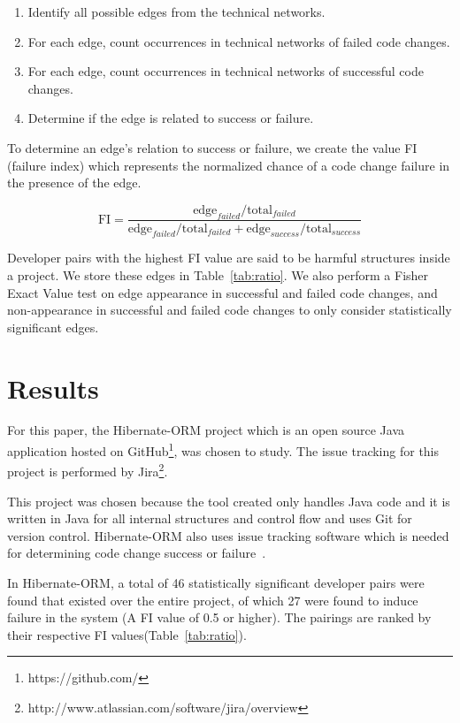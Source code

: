 \documentclass[conference]{IEEEtran}
\begin{document}
\begin{enumerate}
\item Identify all possible edges from the technical networks.
\item For each edge, count occurrences in technical networks of failed code changes.
\item For each edge, count occurrences in technical networks of successful code changes.
\item Determine if the edge is related to success or failure.
\end{enumerate}

To determine an edge's relation to success or failure, we create the value FI (failure
index) which represents the normalized chance of a code change failure in the presence
of the edge. 

\begin{equation}
\text{FI} = \frac{ \text{edge}_{failed} / \text{total}_{failed}}{\text{edge}_{failed} / \text{total}_{failed} + \text{edge}_{success} / \text{total}_{success}}
\end{equation}

Developer pairs with the highest FI value are said to be harmful structures
inside a project. We store these edges in Table~\ref{tab:ratio}. We also perform
a Fisher Exact Value test on edge appearance in successful and failed
code changes, and non-appearance in successful and failed code changes to only
consider statistically significant edges. 


\section{Results}
For this paper, the Hibernate-ORM project which is an open source Java 
application hosted on GitHub\footnote{https://github.com/}, was chosen to study. The issue tracking for this 
project is performed by Jira\footnote{http://www.atlassian.com/software/jira/overview}.

This project was chosen because the tool created only handles Java code and it is written in Java 
for all internal structures and control flow
and uses Git for version control. Hibernate-ORM also uses issue tracking software which 
is needed for determining code change success or failure~\cite{Sliwerski:2005:CIF}.

In Hibernate-ORM, a total of 46 statistically significant developer pairs were found that existed over the entire project, 
of which 27 were found to induce failure in the system (A FI value of 0.5 or higher). 
The pairings are ranked by their respective FI values(Table~\ref{tab:ratio}).
\end{document}
